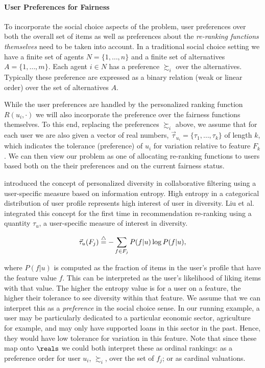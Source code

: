 \noindent \paragraph{User Preferences for Fairness} \newline
\indent To incorporate the social choice aspects of the problem, user preferences over both the overall set of items as well as preferences about the \emph{re-ranking functions themselves} need to be taken into account. In a traditional social choice setting we have a finite set of agents $N = \{1, \ldots, n\}$ and a finite set of alternatives $A = \{1, \ldots, m\}$. Each agent $i \in N$ has a preference $\succsim_i$ over the alternatives. Typically these preference are expressed as a binary relation (weak or linear order) over the set of alternatives $A$.  

While the user preferences are handled by the personalized ranking function $R(u_i, \cdot)$ we will also incorporate the preference over the fairness functions themselves. To this end, replacing the preferences $\succsim_i$ above, we assume that for each user we are also given a vector of real numbers, $\vec{\tau}_{u_i} = \{\tau_1, \ldots, \tau_k\}$ of length $k$, which indicates the tolerance (preference) of $u_i$ for variation relative to feature $F_k$.  We can then view our problem as one of allocating re-ranking functions to users based both on the their preferences and on the current fairness status.
 
\cite{eskan2017-personalized-diversity} introduced the concept of personalized diversity in collaborative filtering using a user-specific measure based on information entropy. High entropy in a categorical distribution of user profile represents high interest of user in diversity. Liu et al. \cite{liu2018personalizing,liu2019personalized} integrated this concept for the first time in recommendation re-ranking using a quantity $\tau_u$, a user-specific measure of interest in diversity.

\begin{equation}
\vec{\tau}_u(F_{j})\buildrel\triangle\over=-\sum_{f \in F_j} P(f|u)\log P(f|u),
\label{eq:tau}
\end{equation}

\noindent where $P(f|u)$ is computed as the fraction of items in the user's profile that have the feature value $f$. This can be interpreted as the user's likelihood of liking items with that value. The higher the entropy value is for a user on a feature, the higher their tolerance to see diversity within that feature. We assume that we can interpret this as a \emph{preference} in the social choice sense. In our running example, a user may be particularly dedicated to a particular economic sector, agriculture for example, and may only have supported loans in this sector in the past.  Hence, they would have low tolerance for variation in this feature. Note that since these map onto $\reals$ we could both interpret these as ordinal rankings: as a preference order for user $u_i$, $\succsim_i$, over the set of $f_j$; or as cardinal valuations.

